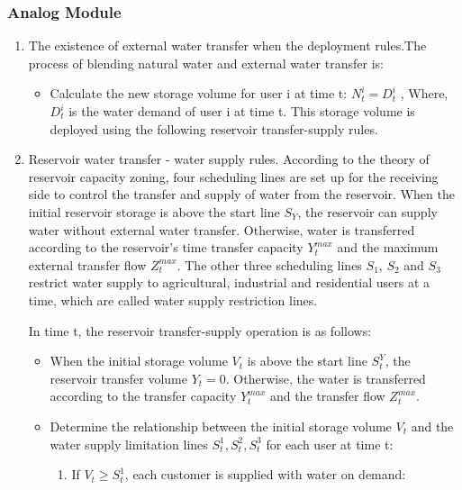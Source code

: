 \subsubsection{Analog Module}
\begin{enumerate}[(1)]
 \item The existence of external water transfer when the deployment rules.The process of blending natural water and external water transfer is:
   \begin{itemize}
   \item Calculate the new storage volume for user i at time t: $ N_{t}^{i}=D_{t}^{i} $ , Where, $ D_{t}^{i} $ is the water demand of user i at time t.  This storage volume is deployed using the following reservoir transfer-supply rules.
   \end{itemize}
  \item Reservoir water transfer - water supply rules. According to the theory of reservoir capacity zoning, four scheduling lines are set up for the receiving side to control the transfer and supply of water from the reservoir. When the initial reservoir storage is above the start line $ S_{Y} $, the reservoir can supply water without external water transfer. Otherwise, water is transferred according to the reservoir's time transfer capacity $ Y^{max}_{t} $ and the maximum external transfer flow $ Z^{max}_{t} $. The other three scheduling lines $ S_{1} $, $ S_{2} $ and $ S_{3} $ restrict water supply to agricultural, industrial and residential users at a time, which are called water supply restriction lines. ~\cite{water_transfer_triggering_mechanism}
  \par
  In time t, the reservoir transfer-supply operation is as follows:
    \begin{itemize}
      \item When the initial storage volume $ V_{t} $ is above the start line $ S^{Y}_{t} $, the reservoir transfer volume $Y_{t}=0$. Otherwise, the water is transferred according to the transfer capacity $Y^{max}_{t}$ and the transfer flow $Z^{max}_t$.
      \item Determine the relationship between the initial storage volume $ V_{t}$ and the water supply limitation lines $S^{1}_{t}, S^{2}_{t}, S^{3}_{t}$ for each user at time t:
       \begin{enumerate}
          \item If $V_{t} \geq S^{1}_{t}$, each customer is supplied with water on demand:

\end{enumerate}
\end{itemize}
\end{enumerate}

